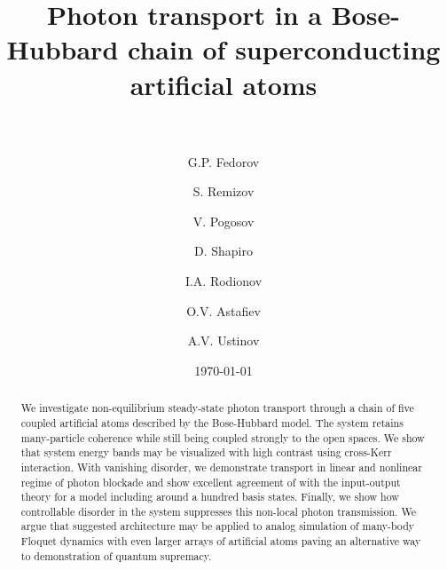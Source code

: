\documentclass[%
 aps, prl,
 amsmath,amssymb,
 reprint,%
superscriptaddress
]{revtex4-2}
\newcommand{\mytitile}{Photon transport in a Bose-Hubbard chain of superconducting artificial atoms}
\begin{document}
	
	\title[\mytitile]{\mytitile\\~}
	\author{G.P. Fedorov}
	
	\author{S. Remizov}
	\author{V. Pogosov}
	\author{D. Shapiro}

	\author{I.A. Rodionov}

	\author{O.V. Astafiev}

	\author{A.V. Ustinov}
	
	
	\date{\today}%
	
	
	\begin{abstract}
We investigate non-equilibrium steady-state photon transport through a chain of five coupled artificial atoms described by the Bose-Hubbard model. The system retains many-particle coherence while still being coupled strongly to the open spaces. We show that system energy bands may be visualized with high contrast using cross-Kerr interaction. With vanishing disorder, we demonstrate transport in linear and nonlinear regime of photon blockade and show excellent agreement of with the input-output theory for a model including around a hundred basis states. Finally, we show how controllable disorder in the system suppresses this non-local photon transmission. We argue that suggested architecture may be applied to analog simulation of many-body Floquet dynamics with even larger arrays of artificial atoms paving an alternative way to demonstration of quantum supremacy.
\end{abstract}
	
\end{document}
